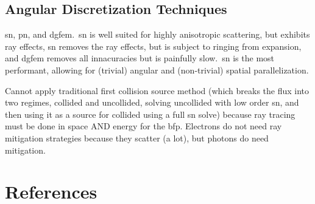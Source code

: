 \subsection{Angular Discretization Techniques}
\gls{sn}, \gls{pn}, and \gls{dgfem}.\ \gls{sn} is well suited for highly anisotropic scattering, but exhibits ray effects, \gls{sn} removes the ray effects, but is subject to ringing from expansion, and \gls{dgfem} removes all innacuracies but is painfully slow.\ \gls{sn} is the most performant, allowing for (trivial) angular and (non-trivial) spatial parallelization. 

Cannot apply traditional first collision source method (which breaks the flux into two regimes, collided and uncollided, solving uncollided with low order \gls{sn}, and then using it as a source for collided using a full \gls{sn} solve) because ray tracing must be done in space AND energy for the \gls{bfp}. Electrons do not need ray mitigation strategies because they scatter (a lot), but photons do need mitigation.

\clearpage
{}
\section*{References}
\printbibliography[heading=none]


